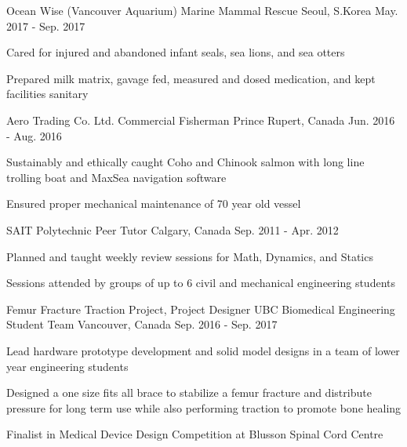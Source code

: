 \begin{cventries}
  \cventry
    {Ocean Wise (Vancouver Aquarium)} %
    {Marine Mammal Rescue} %
    {Seoul, S.Korea} %
    {May. 2017 - Sep. 2017} %
    {
      \begin{cvitems} %
        \item {Cared for injured and abandoned infant seals, sea lions, and sea otters}
        \item {Prepared milk matrix, gavage fed, measured and dosed medication, and kept facilities sanitary}
      \end{cvitems}
    }

  \cventry
    {Aero Trading Co. Ltd.} %
    {Commercial Fisherman} %
    {Prince Rupert, Canada} %
    {Jun. 2016 - Aug. 2016} %
    {
      \begin{cvitems} %
          \item {Sustainably and ethically caught Coho and Chinook salmon with long line trolling boat and MaxSea navigation software}
          \item {Ensured proper mechanical maintenance of 70 year old vessel}
        \end{cvitems}
        }

  \cventry
    {SAIT Polytechnic} %
    {Peer Tutor} %
    {Calgary, Canada} %
    {Sep. 2011 - Apr. 2012} %
    {
      \begin{cvitems} %
        \item {Planned and taught weekly review sessions for Math, Dynamics, and Statics}
        \item {Sessions attended by groups of up to 6 civil and mechanical engineering students}
      \end{cvitems}
    }



  \cventry
    {Femur Fracture Traction Project, Project Designer} %
    {UBC Biomedical Engineering Student Team} %
    {Vancouver, Canada} %
    {Sep. 2016 - Sep. 2017} %
    {
      \begin{cvitems} %
        \item {Lead hardware prototype development and solid model designs in a team of lower year engineering students}
        \item {Designed a one size fits all brace to stabilize a femur fracture and distribute pressure for long term use while also performing traction to promote bone healing}
        \item {Finalist in Medical Device Design Competition at Blusson Spinal Cord Centre}
      \end{cvitems}
    }


\end{cventries}
